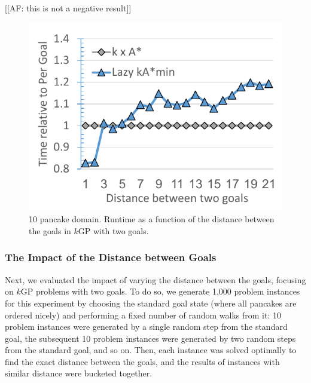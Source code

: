 \documentclass[twoside,11pt]{article}
\newcommand{\kgs}{$k$GP\xspace}
\newcommand{\roni}[1]{\textbf{[RS:#1]}}
\begin{document}
[[AF: this is not a negative result]]



\begin{figure}
  \includegraphics[width=\columnwidth]{pancake-goal-distance_cropped.pdf}
  \caption{10 pancake domain. Runtime as a function of the distance between the goals in \kgs with two goals.}
  \label{fig:2-goal-pancake}
\end{figure}

\subsubsection{The Impact of the Distance between Goals}

Next, we evaluated the impact of varying the distance between the goals, focusing on \kgs problems with two goals.
To do so, we generate 1,000 problem instances for this experiment by choosing the standard goal state (where all pancakes are ordered nicely) and performing a fixed number of random walks from it: 10 problem instances were generated by a single random step from the standard goal, the subsequent 10 problem instances were generated by two random steps from the standard goal, and so on.
Then, each instance was solved optimally to find the exact distance between the goals, and the results of instances with similar distance were bucketed together.
\end{document}
